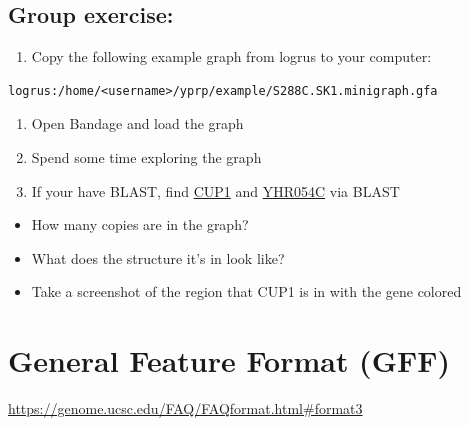 \documentclass[
]{book}
\providecommand{\tightlist}{%
  \setlength{\itemsep}{0pt}\setlength{\parskip}{0pt}}
\begin{document}
\hypertarget{group-exercise}{%
\subsection*{\texorpdfstring{\textbf{Group exercise:}}{Group exercise:}}\label{group-exercise}}

\begin{enumerate}
\def\labelenumi{\arabic{enumi}.}
\tightlist
\item
  Copy the following example graph from logrus to your computer:
\end{enumerate}

\begin{verbatim}
logrus:/home/<username>/yprp/example/S288C.SK1.minigraph.gfa
\end{verbatim}

\begin{enumerate}
\def\labelenumi{\arabic{enumi}.}
\setcounter{enumi}{1}
\tightlist
\item
  Open Bandage and load the graph
\item
  Spend some time exploring the graph
\item
  If your have BLAST, find \href{https://www.yeastgenome.org/locus/S000001095}{CUP1} and \href{https://www.yeastgenome.org/locus/S000001096}{YHR054C} via BLAST
\end{enumerate}

\begin{itemize}
\tightlist
\item
  How many copies are in the graph?
\item
  What does the structure it's in look like?
\item
  Take a screenshot of the region that CUP1 is in with the gene colored
\end{itemize}

\hypertarget{general-feature-format-gff}{%
\section{General Feature Format (GFF)}\label{general-feature-format-gff}}

\url{https://genome.ucsc.edu/FAQ/FAQformat.html\#format3}
\end{document}
